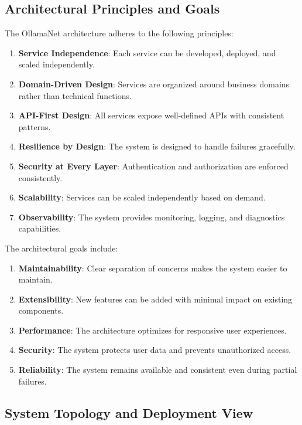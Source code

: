 \subsection{Architectural Principles and Goals}

The OllamaNet architecture adheres to the following principles:

\begin{enumerate}
   \item \textbf{Service Independence}: Each service can be developed, deployed, and scaled independently.
   \item \textbf{Domain-Driven Design}: Services are organized around business domains rather than technical functions.
   \item \textbf{API-First Design}: All services expose well-defined APIs with consistent patterns.
   \item \textbf{Resilience by Design}: The system is designed to handle failures gracefully.
   \item \textbf{Security at Every Layer}: Authentication and authorization are enforced consistently.
   \item \textbf{Scalability}: Services can be scaled independently based on demand.
   \item \textbf{Observability}: The system provides monitoring, logging, and diagnostics capabilities.
\end{enumerate}

The architectural goals include:

\begin{enumerate}
   \item \textbf{Maintainability}: Clear separation of concerns makes the system easier to maintain.
   \item \textbf{Extensibility}: New features can be added with minimal impact on existing components.
   \item \textbf{Performance}: The architecture optimizes for responsive user experiences.
   \item \textbf{Security}: The system protects user data and prevents unauthorized access.
   \item \textbf{Reliability}: The system remains available and consistent even during partial failures.
\end{enumerate}

\subsection{System Topology and Deployment View}

